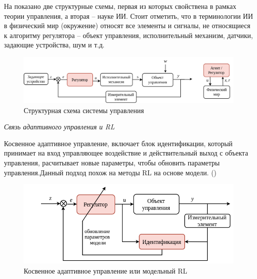 На  показано две структурные схемы, первая из которых свойствена в рамках теории управления, а вторая -- науке ИИ. Стоит отметить, что в терминологии ИИ в физический мир (окружение) относят все элементы и сигналы, не относящиеся к алгоритму регулятора -- объект управления, исполнительный механизм, датчики, задающие устройства, шум и т.д.
%
\begin{figure}[ht!] 
	\centering
	\includegraphics[width=0.8\linewidth]{my_folder/figure/schema/TAY_RL.png}
	\caption{Структурная схема системы управления}
	\label{fig:NA-ch2}
\end{figure}

\textit{Связь адаптивного управления и RL}

Косвенное адаптивное управление, включает блок идентификации, который принимает на вход управляющее воздействие и действительный выход с объекта управления, расчитывает новые параметры, чтобы обновить параметры управления.Данный подход похож на методы RL на основе модели. ()
%
\begin{figure}[ht!] 
	\centering
	\includegraphics[width=0.8\linewidth]{my_folder/figure/schema/adapt1.png}
	\caption{Косвенное адаптивное управление или модельный RL}
	\label{fig:r_adap1-ch2}
\end{figure}
%


